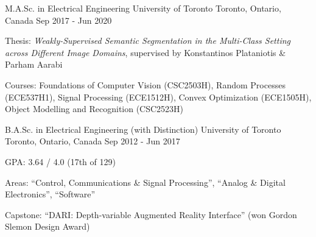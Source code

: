

\begin{cventries}

	\cventry
		{M.A.Sc. in Electrical Engineering} %
    {University of Toronto} %
    {Toronto, Ontario, Canada} %
    {Sep 2017 - Jun 2020} %
    {
				\item{Thesis: \emph{Weakly-Supervised Semantic Segmentation in the Multi-Class Setting across Different Image Domains}, supervised by Konstantinos Plataniotis \& Parham Aarabi}
				\item{Courses: Foundations of Computer Vision (CSC2503H), Random Processes (ECE537H1), Signal Processing (ECE1512H), Convex Optimization (ECE1505H), Object Modelling and Recognition (CSC2523H)}
		}

  \cventry
    {B.A.Sc. in Electrical Engineering (with Distinction)} %
    {University of Toronto} %
    {Toronto, Ontario, Canada} %
    {Sep 2012 - Jun 2017} %
    {
      \begin{cvitems} %
				\item{GPA: 3.64 / 4.0 (17th of 129)}
				\item{Areas: ``Control, Communications \& Signal Processing'', ``Analog \& Digital Electronics'', ``Software''}
				\item{Capstone: ``DARI: Depth-variable Augmented Reality Interface'' (won Gordon Slemon Design Award)}
			\end{cvitems}
    }

\end{cventries}
